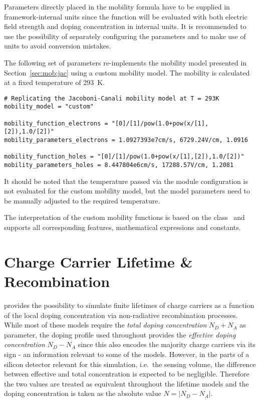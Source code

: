 \begin{warning}
Parameters directly placed in the mobility formula have to be supplied in framework-internal units since the function will be evaluated with both electric field strength and doping concentration in internal units.
It is recommended to use the possibility of separately configuring the parameters and to make use of units to avoid conversion mistakes.
\end{warning}

The following set of parameters re-implements the mobility model presented in Section~\ref{sec:mob:jac} using a custom mobility model.
The mobility is calculated at a fixed temperature of \SI{293}{K}.
\begin{verbatim}
# Replicating the Jacoboni-Canali mobility model at T = 293K
mobility_model = "custom"

mobility_function_electrons = "[0]/[1]/pow(1.0+pow(x/[1],[2]),1.0/[2])"
mobility_parameters_electrons = 1.0927393e7cm/s, 6729.24V/cm, 1.0916

mobility_function_holes = "[0]/[1]/pow(1.0+pow(x/[1],[2]),1.0/[2])"
mobility_parameters_holes = 8.447804e6cm/s, 17288.57V/cm, 1.2081
\end{verbatim}

\begin{warning}
It should be noted that the temperature passed via the module configuration is not evaluated for the custom mobility model, but the model parameters need to be manually adjusted to the required temperature.
\end{warning}

The interpretation of the custom mobility functions is based on the  class~\cite{rootformula} and supports all corresponding features, mathematical expressions and constants.

\section{Charge Carrier Lifetime \& Recombination}
\label{sec:recombination}

\apsq provides the possibility to simulate finite lifetimes of charge carriers as a function of the local doping concentration via non-radiative recombination processes.
While most of these models require the \emph{total doping concentration} $N_D + N_A$ as parameter, the doping profile used throughout \apsq provides the \emph{effective doping concentration} $N_D - N_A$ since this also encodes the majority charge carriers via its sign - an information relevant to some of the models.
However, in the parts of a silicon detector relevant for this simulation, i.e.\ the sensing volume, the difference between effective and total concentration is expected to be negligible.
Therefore the two values are treated as equivalent throughout the lifetime models and the doping concentration is taken as the absolute value $N = \left|N_D - N_A\right|$.

